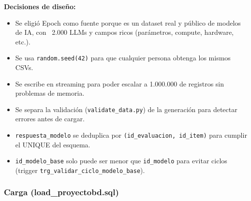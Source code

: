 \documentclass[12pt,a4paper]{article}
\begin{document}
\textbf{Decisiones de diseño:}
\begin{itemize}
  \item Se eligió Epoch como fuente porque es un dataset real y público de modelos de IA, con ~2.000 LLMs y campos ricos (parámetros, compute, hardware, etc.).
  \item Se usa \texttt{random.seed(42)} para que cualquier persona obtenga los mismos CSVs.
  \item Se escribe en streaming para poder escalar a 1.000.000 de registros sin problemas de memoria.
  \item Se separa la validación (\texttt{validate\_data.py}) de la generación para detectar errores antes de cargar.
  \item \texttt{respuesta\_modelo} se deduplica por \texttt{(id\_evaluacion, id\_item)} para cumplir el UNIQUE del esquema.
  \item \texttt{id\_modelo\_base} solo puede ser menor que \texttt{id\_modelo} para evitar ciclos (trigger \texttt{trg\_validar\_ciclo\_modelo\_base}).
\end{itemize}

\subsubsection{Carga (load\_proyectobd.sql)}
\end{document}

